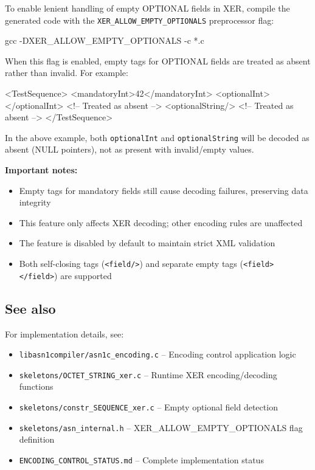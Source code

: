 \documentclass[english,oneside,12pt]{book}
\begin{document}
To enable lenient handling of empty OPTIONAL fields in XER, compile the generated code 
with the \texttt{XER\_ALLOW\_EMPTY\_OPTIONALS} preprocessor flag:

\begin{bash}
gcc -DXER_ALLOW_EMPTY_OPTIONALS -c *.c
\end{bash}

When this flag is enabled, empty tags for OPTIONAL fields are treated as absent rather 
than invalid. For example:

\begin{example}
<TestSequence>
    <mandatoryInt>42</mandatoryInt>
    <optionalInt></optionalInt>    <!-- Treated as absent -->
    <optionalString/>              <!-- Treated as absent -->
</TestSequence>
\end{example}

In the above example, both \texttt{optionalInt} and \texttt{optionalString} will be 
decoded as absent (NULL pointers), not as present with invalid/empty values.

\textbf{Important notes:}
\begin{itemize}
\item Empty tags for mandatory fields still cause decoding failures, preserving data integrity
\item This feature only affects XER decoding; other encoding rules are unaffected
\item The feature is disabled by default to maintain strict XML validation
\item Both self-closing tags (\texttt{<field/>}) and separate empty tags 
(\texttt{<field></field>}) are supported
\end{itemize}

\subsection*{See also}

For implementation details, see:
\begin{itemize}
\item \texttt{libasn1compiler/asn1c\_encoding.c} -- Encoding control application logic
\item \texttt{skeletons/OCTET\_STRING\_xer.c} -- Runtime XER encoding/decoding functions
\item \texttt{skeletons/constr\_SEQUENCE\_xer.c} -- Empty optional field detection
\item \texttt{skeletons/asn\_internal.h} -- XER\_ALLOW\_EMPTY\_OPTIONALS flag definition
\item \texttt{ENCODING\_CONTROL\_STATUS.md} -- Complete implementation status
\end{itemize}
\end{document}
